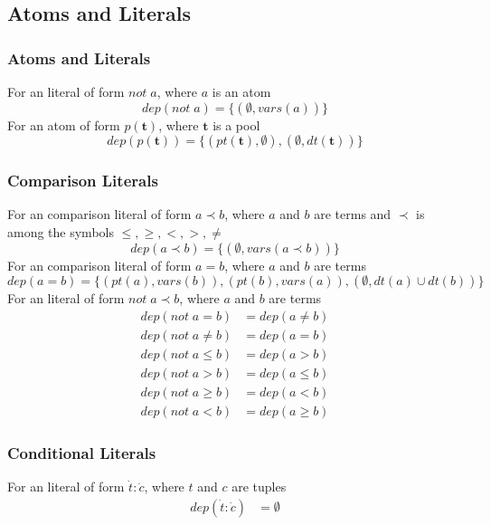 \documentclass{article}
\newcommand{\pool}[1]{\boldsymbol{#1}}
\newcommand{\tuple}[1]{\dot{#1}}
\newcommand{\set}[1]{\{#1\}}
\newcommand{\dep}[2]{\{(#1), (#2)\}}
\begin{document}
	\subsection{Atoms and Literals}
	\subsubsection{Atoms and Literals}
	For an literal of form $not \; a$, where $a$ is an atom
	\begin{equation*}
		dep(not \; a) = \set{(\emptyset, vars(a))}
	\end{equation*}
	For an atom of form $p(\pool{t})$, where $\pool{t}$ is a pool
	\begin{equation*}
		dep(p(\pool{t})) = \dep{pt(\pool{t}), \emptyset}{\emptyset, dt(\pool{t})}
	\end{equation*}

	\subsubsection{Comparison Literals}
	For an comparison literal of form $a \prec b$, where $a$ and $b$ are terms and $\prec$ is among the symbols $\leq,\ge,<,>,\neq$
	\begin{equation*}
		dep(a \prec b) = \set{(\emptyset, vars(a \prec b))}
	\end{equation*}
	For an comparison literal of form $a = b$, where $a$ and $b$ are terms
	\begin{equation*}
		dep(a = b) = \set{(pt(a), vars(b)), (pt(b), vars(a)), (\emptyset, dt(a) \cup dt(b))}
	\end{equation*}
	For an literal of form $not \; a \prec b$, where $a$ and $b$ are terms
	\begin{align*}
		dep(not \; a = b) &= dep(a \neq b) \\
		dep(not \; a \neq b) &= dep(a = b) \\
		dep(not \; a \leq b) &= dep(a > b) \\
		dep(not \; a > b) &= dep(a \leq b) \\
		dep(not \; a \ge b) &= dep(a < b) \\
		dep(not \; a < b) &= dep(a \ge b)
	\end{align*}

	\subsubsection{Conditional Literals}
	For an literal of form $\tuple{t} : \tuple{c}$, where $t$ and $c$ are tuples
	\begin{align*}
		dep(\tuple{t} : \tuple{c}) &= \emptyset
	\end{align*}
\end{document}
